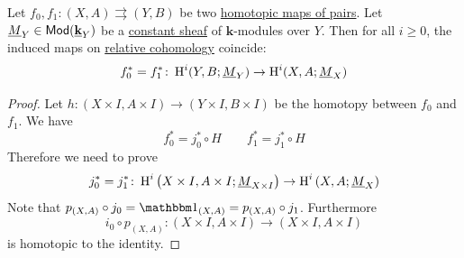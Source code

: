 \documentclass[../../main]{subfiles}
\begin{document}
\begin{theorem}[Homotopy]\label{thm:homotopy-pairs}
  Let \(f_{0}, f_{1}\colon (X, A) \rightrightarrows (Y, B)\) be two \hyperref[def:homotopy-over]{homotopic maps of pairs}.
  Let \(\underline{M}_{Y} \in \mathsf{Mod}( \underline{\mathbf{k}}_{Y} )\) be a \hyperref[def:constant-sheaf]{constant sheaf} of \(\mathbf{k}\)-modules over \(Y\).
  Then for all \(i \geq 0\), the induced maps on \hyperref[def:relative-sheaf-cohomology]{relative cohomology} coincide:
  \begin{equation*}
    f_{0}^{\ast} = f_{1}^{\ast} \colon \operatorname{H}^{i}(Y, B; \underline{M}_{Y}) \to \operatorname{H}^{i}(X, A; \underline{M}_{X})
  \end{equation*}
\end{theorem}
\begin{proof}
  Let \(h\colon (X \times I, A \times I) \to (Y \times I, B \times I)\) be the homotopy between \(f_{0}\) and \(f_{1}\).
  We have
  \begin{equation*}
    f_{0}^{\ast} = j_{0}^{\ast} \circ H \qquad f_{1}^{\ast} = j_{1}^{\ast} \circ H
  \end{equation*}
  Therefore we need to prove
  \begin{equation*}
    j_{0}^{\ast} = j_{1}^{\ast}\colon \operatorname{H}^{i} \left( X \times I, A \times I; \underline{M}_{X \times I} \right) \to \operatorname{H}^{i} \left( X, A; \underline{M}_{X} \right)
  \end{equation*}
  Note that \(p_{(X, A)} \circ j_{0} = \id_{(X, A)} = p_{(X, A)} \circ j_{1}\).
  Furthermore
  \begin{equation*}
    i_{0} \circ p_{(X, A)}\colon (X \times I, A \times I) \to (X \times I, A \times I)
  \end{equation*}
  is homotopic to the identity.


\end{proof}
\end{document}
